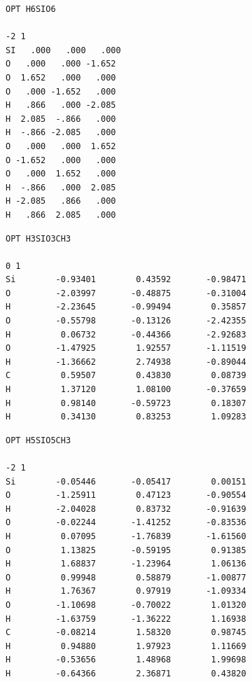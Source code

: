 \documentclass[
  printed, %
  table,   %
  lof,     %
  lot,     %
  oneside,
]{fithesis3}
\begin{document}
 \begin{lstlisting}[frame=single, caption={\ce{(H6SiO6)^{2-}} },label=DescriptiveLabel]
OPT H6SIO6 

-2 1
SI   .000   .000   .000  
O   .000   .000 -1.652 
O  1.652   .000   .000 
O   .000 -1.652   .000 
H   .866   .000 -2.085 
H  2.085  -.866   .000 
H  -.866 -2.085   .000 
O   .000   .000  1.652 
O -1.652   .000   .000 
O   .000  1.652   .000 
H  -.866   .000  2.085 
H -2.085   .866   .000 
H   .866  2.085   .000
 \end{lstlisting}
  
  \newpage
  
  \begin{lstlisting}[frame=single, caption={\ce{H3SiO3CH3}},label=DescriptiveLabel]
OPT H3SIO3CH3

0 1
Si        -0.93401        0.43592       -0.98471
O         -2.03997       -0.48875       -0.31004
H         -2.23645       -0.99494        0.35857
O         -0.55798       -0.13126       -2.42355
H          0.06732       -0.44366       -2.92683
O         -1.47925        1.92557       -1.11519
H         -1.36662        2.74938       -0.89044
C          0.59507        0.43830        0.08739
H          1.37120        1.08100       -0.37659
H          0.98140       -0.59723        0.18307
H          0.34130        0.83253        1.09283
 \end{lstlisting}

\begin{lstlisting}[frame=single, caption={\ce{(H5SiO5CH3)^{2-}}},label=DescriptiveLabel]
OPT H5SIO5CH3

-2 1
Si        -0.05446       -0.05417        0.00151
O         -1.25911        0.47123       -0.90554
H         -2.04028        0.83732       -0.91639
O         -0.02244       -1.41252       -0.83536
H          0.07095       -1.76839       -1.61560
O          1.13825       -0.59195        0.91385
H          1.68837       -1.23964        1.06136
O          0.99948        0.58879       -1.00877
H          1.76367        0.97919       -1.09334
O         -1.10698       -0.70022        1.01320
H         -1.63759       -1.36222        1.16938
C         -0.08214        1.58320        0.98745
H          0.94880        1.97923        1.11669
H         -0.53656        1.48968        1.99698
H         -0.64366        2.36871        0.43820

 \end{lstlisting}
 \newpage
 
\end{document}
